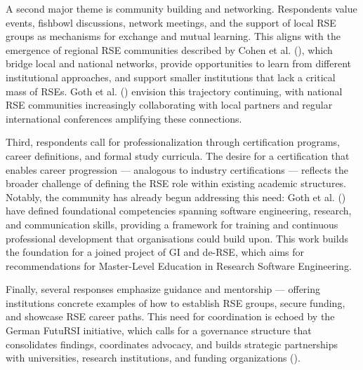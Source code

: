 \documentclass{eceasst}
\begin{document}
A second major theme is community building and networking. Respondents value events, fishbowl discussions, network meetings, and the support of local RSE groups as mechanisms for exchange and mutual learning. This aligns with the emergence of regional RSE communities described by Cohen et al. (\cite{Cohen:2021}), which bridge local and national networks, provide opportunities to learn from different institutional approaches, and support smaller institutions that lack a critical mass of RSEs. Goth et al. (\cite{Goth:2025b}) envision this trajectory continuing, with national RSE communities increasingly collaborating with local partners and regular international conferences amplifying these connections.

Third, respondents call for professionalization through certification programs, career definitions, and formal study curricula. The desire for a certification that enables career progression — analogous to industry certifications — reflects the broader challenge of defining the RSE role within existing academic structures. Notably, the community has already begun addressing this need: Goth et al. (\cite{Goth:2025}) have defined foundational competencies spanning software engineering, research, and communication skills, providing a framework for training and continuous professional development that organisations could build upon. This work builds the foundation for a joined project of GI and de-RSE, which aims for recommendations for Master-Level Education in Research Software Engineering.

Finally, several responses emphasize guidance and mentorship — offering institutions concrete examples of how to establish RSE groups, secure funding, and showcase RSE career paths. This need for coordination is echoed by the German FutuRSI initiative, which calls for a governance structure that consolidates findings, coordinates advocacy, and builds strategic partnerships with universities, research institutions, and funding organizations (\cite{Mannseicher:2025a}).
\end{document}
